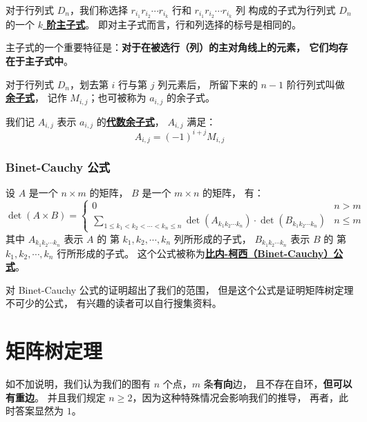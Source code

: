 \documentclass[UTF8]{article}
\begin{document}
	\bigskip


	对于行列式 $D_n$，我们称选择
	$r_{i_1} r_{i_2} \cdots r_{i_k}$ 行和
	$r_{i_1} r_{i_2} \cdots r_{i_k}$ 列
	构成的子式为行列式 $D_n$ 的一个 \textbf{\uline{$k$ 阶主子式}}。
	即对主子式而言，行和列选择的标号是相同的。

	主子式的一个重要特征是：\textbf{对于在被选行（列）的主对角线上的元素，
	它们均存在于主子式中}。

	\bigskip


	对于行列式 $D_n$，划去第 $i$ 行与第 $j$ 列元素后，
	所留下来的 $n - 1$ 阶行列式叫做\textbf{\uline{余子式}}，
	记作 $M_{i, j}$；也可被称为 $a_{i, j}$ 的余子式。

	\bigskip


	我们记 $A_{i, j}$ 表示 $a_{i, j}$ 的\textbf{\uline{代数余子式}}，
	$A_{i, j}$ 满足：
	$$
	A_{i, j} = (-1)^{i + j}M_{i, j}
	$$

	\subsubsection{Binet-Cauchy 公式}

	设 $A$ 是一个 $n \times m$ 的矩阵，
	$B$ 是一个 $m \times n$ 的矩阵，
	有：
	\begin{equation*}
		\det(A \times B) =
		\begin{cases}
			0 & n > m
			\\
			\sum_{1 \le k_1 < k_2 < \cdots < k_n \le n}
			\det(A_{k_1 k_2 \cdots k_n}) \cdot
			\det(B_{k_1 k_2 \cdots k_n})
			& n \le m
		\end{cases}
	\end{equation*}
	其中 $A_{k_1 k_2 \cdots k_n}$ 表示 $A$ 的
	第 $k_1, k_2, \cdots, k_n$ 列所形成的子式，
	$B_{k_1 k_2 \cdots k_n}$ 表示 $B$ 的
	第 $k_1, k_2, \cdots, k_n$ 行所形成的子式。
	这个公式被称为\textbf{\uline{比内-柯西（Binet-Cauchy）公式}}。

	对 Binet-Cauchy 公式的证明超出了我们的范围，
	但是这个公式是证明矩阵树定理不可少的公式，
	有兴趣的读者可以自行搜集资料。

	\section{矩阵树定理}

	如不加说明，我们认为我们的图有 $n$ 个点，$m$ 条\textbf{有向}边，
	且不存在自环，\textbf{但可以有重边}。
	并且我们规定 $n \ge 2$，因为这种特殊情况会影响我们的推导，
	再者，此时答案显然为 $1$。
\end{document}
